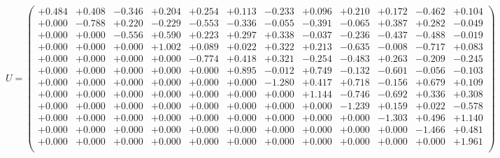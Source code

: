 \documentclass[9pt]{article}
\theoremstyle{plain}
\theoremstyle{definition}
\theoremstyle{remark}
\numberwithin{equation}{section}
\begin{document}
$U = \left(
\begin{array}{
cccccccccccc}
+0.484 & +0.408 & -0.346 & +0.204 & +0.254 & +0.113 & -0.233 & +0.096 & +0.210 & +0.172 & -0.462 & +0.104 \\
+0.000 & -0.788 & +0.220 & -0.229 & -0.553 & -0.336 & -0.055 & -0.391 & -0.065 & +0.387 & +0.282 & -0.049 \\
+0.000 & +0.000 & -0.556 & +0.590 & +0.223 & +0.297 & +0.338 & -0.037 & -0.236 & -0.437 & -0.488 & -0.019 \\
+0.000 & +0.000 & +0.000 & +1.002 & +0.089 & +0.022 & +0.322 & +0.213 & -0.635 & -0.008 & -0.717 & +0.083 \\
+0.000 & +0.000 & +0.000 & +0.000 & -0.774 & +0.418 & +0.321 & -0.254 & -0.483 & +0.263 & -0.209 & -0.245 \\
+0.000 & +0.000 & +0.000 & +0.000 & +0.000 & +0.895 & -0.012 & +0.749 & -0.132 & -0.601 & -0.056 & -0.103 \\
+0.000 & +0.000 & +0.000 & +0.000 & +0.000 & +0.000 & -1.280 & +0.417 & +0.718 & -0.156 & +0.679 & +0.109 \\
+0.000 & +0.000 & +0.000 & +0.000 & +0.000 & +0.000 & +0.000 & +1.144 & -0.746 & -0.692 & +0.336 & +0.308 \\
+0.000 & +0.000 & +0.000 & +0.000 & +0.000 & +0.000 & +0.000 & +0.000 & -1.239 & +0.159 & +0.022 & -0.578 \\
+0.000 & +0.000 & +0.000 & +0.000 & +0.000 & +0.000 & +0.000 & +0.000 & +0.000 & -1.303 & +0.496 & +1.140 \\
+0.000 & +0.000 & +0.000 & +0.000 & +0.000 & +0.000 & +0.000 & +0.000 & +0.000 & +0.000 & -1.466 & +0.481 \\
+0.000 & +0.000 & +0.000 & +0.000 & +0.000 & +0.000 & +0.000 & +0.000 & +0.000 & +0.000 & +0.000 & +1.961 \\
\end{array}
\right)$ \newline 
\end{document}

